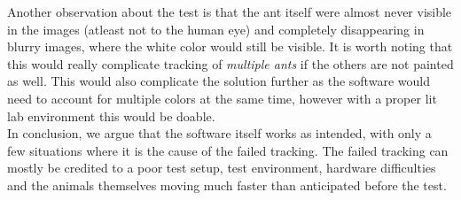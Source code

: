 Another observation about the test is that the ant itself were almost never visible in the images (atleast not to the human eye) and completely disappearing in blurry images, where the white color would still be visible. It is worth noting that this would really complicate tracking of \emph{multiple ants} if the others are not painted as well. This would also complicate the solution further as the software would need to account for multiple colors at the same time, however with a proper lit lab environment this would be doable.\\

In conclusion, we argue that the software itself works as intended, with only a few situations where it is the cause of the failed tracking. The failed tracking can mostly be credited to a poor test setup, test environment, hardware difficulties and the animals themselves moving much faster than anticipated before the test.\\
